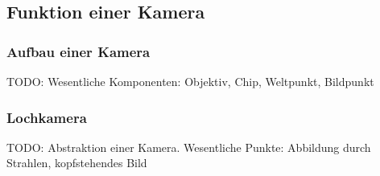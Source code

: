 %
%
%
\subsection{Funktion einer Kamera\label{subsection:kamerafunktion}}
\subsubsection{Aufbau einer Kamera}
TODO: Wesentliche Komponenten: Objektiv, Chip, Weltpunkt, Bildpunkt

\subsubsection{Lochkamera}
TODO: Abstraktion einer Kamera. Wesentliche Punkte: Abbildung durch 
Strahlen, kopfstehendes Bild

